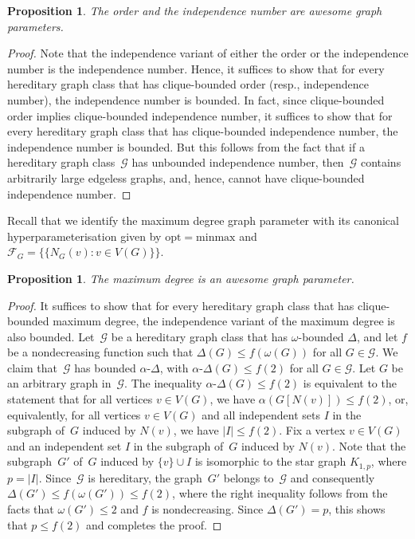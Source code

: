 \documentclass[11pt]{article}
\newcommand{\minmax}{\mathrm{minmax}}
\newcommand{\opt}{\mathrm{opt}}
\theoremstyle{plain}
\newtheorem{proposition}[theorem]{Proposition}
\theoremstyle{definition}
\theoremstyle{remark}
\numberwithin{equation}{section}
\begin{document}
\begin{proposition}\label{prop:alpha-and-n-are-awesome}
The order and the independence number are awesome graph parameters.
\end{proposition}

\begin{proof}
Note that the independence variant of either the order or the independence number is the independence number.
Hence, it suffices to show that for every hereditary graph class that has clique-bounded order (resp., independence number), the independence number is bounded.
In fact, since  clique-bounded order implies  clique-bounded independence number, it suffices to show that for every hereditary graph class that has clique-bounded independence number, the independence number is bounded.
But this follows from the fact that if a hereditary graph class~$\mathcal{G}$ has unbounded independence number, then~$\mathcal{G}$ contains arbitrarily large edgeless graphs, and, hence, cannot have  clique-bounded independence number.
\end{proof}

Recall that we identify the maximum degree graph parameter with its canonical hyperparameterisation given by $\opt = \minmax$ and $\mathcal{F}_G = \big\{\{N_G(v) \colon v\in V(G)\}\big\}$.

\begin{proposition}\label{prop:Delta-is-awesome}
The maximum degree is an awesome graph parameter.
\end{proposition}

\begin{proof}
It suffices to show that for every hereditary graph class that has clique-bounded maximum degree, the independence variant of the maximum degree is also bounded.
Let~$\mathcal{G}$ be a hereditary graph class that has $\omega$-bounded $\Delta$, and let $f$ be a nondecreasing function such that $\Delta(G)\le f(\omega(G))$ for all $G\in \mathcal{G}$.
We claim that~$\mathcal{G}$ has bounded $\alpha\text{-}\Delta$, with $\alpha\text{-}\Delta(G)\le f(2)$ for all $G\in \mathcal{G}$.
Let $G$ be an arbitrary graph in~$\mathcal{G}$.
The inequality $\alpha\text{-}\Delta(G)\le f(2)$ is equivalent to the statement that for all vertices $v\in V(G)$, we have $\alpha(G[N(v)])\le f(2)$, or, equivalently, for all vertices $v\in V(G)$ and all independent sets $I$ in the subgraph of~$G$ induced by $N(v)$, we have $|I|\le f(2)$.
Fix a vertex $v\in V(G)$ and an independent set $I$ in the subgraph of~$G$ induced by $N(v)$.
Note that the subgraph~$G'$ of~$G$ induced by $\{v\}\cup I$ is isomorphic to the star graph $K_{1,p}$, where $p = |I|$.
Since~$\mathcal{G}$ is hereditary, the graph~$G'$ belongs to~$\mathcal{G}$ and consequently $\Delta(G')\le f(\omega(G'))\le f(2)$, where the right inequality follows from the facts that $\omega(G')\le 2$ and $f$ is nondecreasing.
Since $\Delta(G') = p$, this shows that $p\le f(2)$ and completes the proof.
\end{proof}
\end{document}
